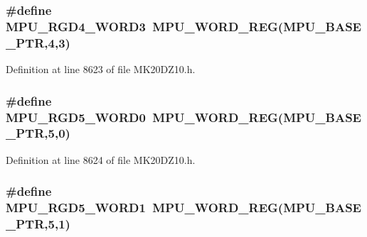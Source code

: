 \subsubsection[{\texorpdfstring{M\+P\+U\+\_\+\+R\+G\+D4\+\_\+\+W\+O\+R\+D3}{MPU_RGD4_WORD3}}]{\setlength{\rightskip}{0pt plus 5cm}\#define M\+P\+U\+\_\+\+R\+G\+D4\+\_\+\+W\+O\+R\+D3~{\bf M\+P\+U\+\_\+\+W\+O\+R\+D\+\_\+\+R\+EG}({\bf M\+P\+U\+\_\+\+B\+A\+S\+E\+\_\+\+P\+TR},4,3)}\hypertarget{group___m_p_u___register___accessor___macros_ga79c351ec2317791844d827711e72819d}{}\label{group___m_p_u___register___accessor___macros_ga79c351ec2317791844d827711e72819d}


Definition at line 8623 of file M\+K20\+D\+Z10.\+h.

\subsubsection[{\texorpdfstring{M\+P\+U\+\_\+\+R\+G\+D5\+\_\+\+W\+O\+R\+D0}{MPU_RGD5_WORD0}}]{\setlength{\rightskip}{0pt plus 5cm}\#define M\+P\+U\+\_\+\+R\+G\+D5\+\_\+\+W\+O\+R\+D0~{\bf M\+P\+U\+\_\+\+W\+O\+R\+D\+\_\+\+R\+EG}({\bf M\+P\+U\+\_\+\+B\+A\+S\+E\+\_\+\+P\+TR},5,0)}\hypertarget{group___m_p_u___register___accessor___macros_gaf21c93bc82424e971f8ae536b8b2a1ca}{}\label{group___m_p_u___register___accessor___macros_gaf21c93bc82424e971f8ae536b8b2a1ca}


Definition at line 8624 of file M\+K20\+D\+Z10.\+h.

\subsubsection[{\texorpdfstring{M\+P\+U\+\_\+\+R\+G\+D5\+\_\+\+W\+O\+R\+D1}{MPU_RGD5_WORD1}}]{\setlength{\rightskip}{0pt plus 5cm}\#define M\+P\+U\+\_\+\+R\+G\+D5\+\_\+\+W\+O\+R\+D1~{\bf M\+P\+U\+\_\+\+W\+O\+R\+D\+\_\+\+R\+EG}({\bf M\+P\+U\+\_\+\+B\+A\+S\+E\+\_\+\+P\+TR},5,1)}\hypertarget{group___m_p_u___register___accessor___macros_ga2860c8fb8b3a4c811b2bf6612a1130e5}{}\label{group___m_p_u___register___accessor___macros_ga2860c8fb8b3a4c811b2bf6612a1130e5}


